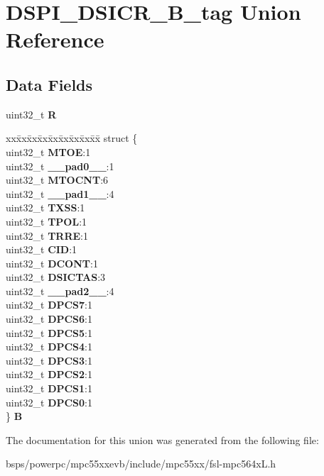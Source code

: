 \hypertarget{unionDSPI__DSICR__32B__tag}{}\section{D\+S\+P\+I\+\_\+\+D\+S\+I\+C\+R\+\_\+B\+\_\+tag Union Reference}
\label{unionDSPI__DSICR__32B__tag}
\subsection*{Data Fields}
\begin{DoxyCompactItemize}
\item 
\mbox{\label{unionDSPI__DSICR__32B__tag_a0a29c0f8923b763036e12089cad67d53}} 
uint32\+\_\+t {\bfseries R}
\item 
\mbox{\label{unionDSPI__DSICR__32B__tag_a73aff210a321c1691eea074a555292d9}} 
\begin{tabbing}
xx\=xx\=xx\=xx\=xx\=xx\=xx\=xx\=xx\=\kill
struct \{\\
\>uint32\_t {\bfseries MTOE}:1\\
\>uint32\_t {\bfseries \_\_pad0\_\_}:1\\
\>uint32\_t {\bfseries MTOCNT}:6\\
\>uint32\_t {\bfseries \_\_pad1\_\_}:4\\
\>uint32\_t {\bfseries TXSS}:1\\
\>uint32\_t {\bfseries TPOL}:1\\
\>uint32\_t {\bfseries TRRE}:1\\
\>uint32\_t {\bfseries CID}:1\\
\>uint32\_t {\bfseries DCONT}:1\\
\>uint32\_t {\bfseries DSICTAS}:3\\
\>uint32\_t {\bfseries \_\_pad2\_\_}:4\\
\>uint32\_t {\bfseries DPCS7}:1\\
\>uint32\_t {\bfseries DPCS6}:1\\
\>uint32\_t {\bfseries DPCS5}:1\\
\>uint32\_t {\bfseries DPCS4}:1\\
\>uint32\_t {\bfseries DPCS3}:1\\
\>uint32\_t {\bfseries DPCS2}:1\\
\>uint32\_t {\bfseries DPCS1}:1\\
\>uint32\_t {\bfseries DPCS0}:1\\
\} {\bfseries B}\\

\end{tabbing}\end{DoxyCompactItemize}


The documentation for this union was generated from the following file\+:\begin{DoxyCompactItemize}
\item 
bsps/powerpc/mpc55xxevb/include/mpc55xx/fsl-\/mpc564x\+L.\+h\end{DoxyCompactItemize}

